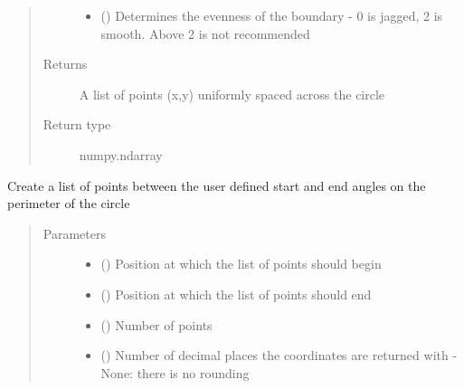 \documentclass[letterpaper,10pt,english]{sphinxmanual}
\begin{document}
\begin{fulllineitems}
\begin{fulllineitems}
\begin{quote}
\begin{description}
\begin{itemize}
\item {} 
 () \textendash{} Determines the evenness of the boundary - 0 is jagged, 2 is smooth. Above 2 is not recommended

\end{itemize}

\item[{Returns}] \leavevmode
A list of points (x,y) uniformly spaced across the circle

\item[{Return type}] \leavevmode
numpy.ndarray

\end{description}\end{quote}

\end{fulllineitems}


\begin{fulllineitems}
\label{\detokenize{source/pyzones:pyzones.Circle.get_perimeter}}
Create a list of points between the user defined start and end angles on the perimeter of the circle
\begin{quote}\begin{description}
\item[{Parameters}] \leavevmode\begin{itemize}
\item {} 
 () \textendash{} Position at which the list of points should begin

\item {} 
 () \textendash{} Position at which the list of points should end

\item {} 
 () \textendash{} Number of points

\item {} 
 () \textendash{} Number of decimal places the coordinates are returned with - None: there is no rounding


\end{itemize}
\end{description}
\end{quote}
\end{fulllineitems}
\end{fulllineitems}
\end{document}
